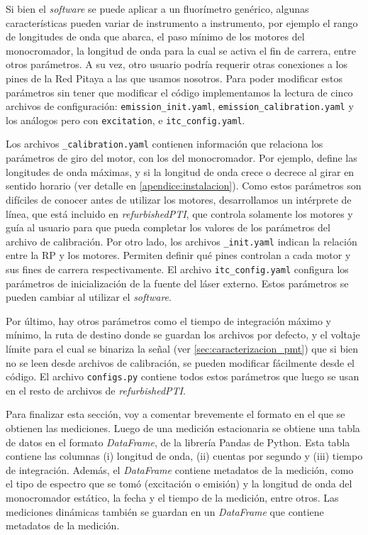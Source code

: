 Si bien el \textit{software} se puede aplicar a un fluorímetro genérico, algunas características pueden variar de instrumento a instrumento, por ejemplo el rango de longitudes de onda que abarca, el paso mínimo de los motores del monocromador, la longitud de onda para la cual se activa el fin de carrera, entre otros parámetros.
A su vez, otro usuario podría requerir otras conexiones a los pines de la Red Pitaya a las que usamos nosotros.
Para poder modificar estos parámetros sin tener que modificar el código implementamos la lectura de cinco archivos de configuración: \texttt{emission\_init.yaml}, \texttt{emission\_calibration.yaml} y los análogos pero con \texttt{excitation}, e \texttt{itc\_config.yaml}.

Los archivos \texttt{\_calibration.yaml} contienen información que relaciona los parámetros de giro del motor, con los del monocromador. 
Por ejemplo, define las longitudes de onda máximas, y si la longitud de onda crece o decrece al girar en sentido horario (ver detalle en \ref{apendice:instalacion}).
Como estos parámetros son difíciles de conocer antes de utilizar los motores, desarrollamos un intérprete de línea, que está incluido en \textit{refurbishedPTI}, que controla solamente los motores y guía al usuario para que pueda completar los valores de los parámetros del archivo de calibración.
Por otro lado, los archivos \texttt{\_init.yaml} indican la relación entre la RP y los motores.
Permiten definir qué pines controlan a cada motor y sus fines de carrera respectivamente.
El archivo \texttt{itc\_config.yaml} configura los parámetros de inicialización de la fuente del láser externo.
Estos parámetros se pueden cambiar al utilizar el \textit{software}.

Por último, hay otros parámetros como el tiempo de integración máximo y mínimo, la ruta de destino donde se guardan los archivos por defecto, y el voltaje límite para el cual se binariza la señal (ver \ref{sec:caracterizacion_pmt}) que si bien no se leen desde archivos de calibración, se pueden modificar fácilmente desde el código.
El archivo \texttt{configs.py} contiene todos estos parámetros que luego se usan en el resto de archivos de \textit{refurbishedPTI}.

Para finalizar esta sección, voy a comentar brevemente el formato en el que se obtienen las mediciones.
Luego de una medición estacionaria se obtiene una tabla de datos en el formato \textit{DataFrame}, de la librería Pandas de Python.
Esta tabla contiene las columnas (i) longitud de onda, (ii) cuentas por segundo y (iii) tiempo de integración.
Además, el \textit{DataFrame} contiene metadatos de la medición, como el tipo de espectro que se tomó (excitación o emisión) y la longitud de onda del monocromador estático, la fecha y el tiempo de la medición, entre otros.
Las mediciones dinámicas también se guardan en un \textit{DataFrame} que contiene metadatos de la medición.

